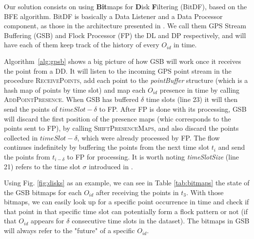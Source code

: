 Our solution consists on using \textbf{Bit}maps for \textbf{D}isk \textbf{F}iltering (BitDF), based on the BFE
algorithm. BitDF is basically a Data Listener and a Data Processor component, as those in the architecture presented in
. We call them GPS Stream Buffering (GSB) and Flock Processor (FP) the DL and DP respectively,
and will have each of them keep track of the history of every $O_{id}$ in time.

Algorithm~\ref{alg:gpsb} shows a big picture of how GSB will work once it receives the point from a DD. It will listen
to the incoming GPS point stream in the procedure \textsc{ReceivePoints}, add each point to the \textit{pointBuffer}
structure (which is a hash map of points by time slot) and map each $O_{id}$ presence in time by calling
\textsc{AddPointPresence}. When GSB has buffered $\delta$ time slots (line 23) it will then send the points of $timeSlot
- \delta$ to FP. After FP is done with its processing, GSB will discard the first position of the presence maps (whic
corresponds to the points sent to FP), by calling \textsc{ShiftPresenceMaps}, and also discard the points collected in
$timeSlot - \delta$, which were already processed by FP. The flow continues indefinitely by buffering the points from
the next time slot $t_i$ and send the points from $t_{i - \delta}$ to FP for processing. It is worth noting
\textit{timeSlotSize} (line 21) refers to the time slot $\sigma$ introduced in .

Using Fig. \ref{fig:disks} as an example, we can see in Table \ref{tab:bitmaps} the state of the GSB bitmaps for each
$O_{id}$ after receiving the points in $t_3$. With those bitmaps, we can easily look up for a specific point occurrence
in time and check if that point in that specific time slot can potentially form a flock pattern or not (if that $O_{id}$
appears for $\delta$ consecutive time slots in the dataset). The bitmaps in GSB will always refer to the "future" of a
specific $O_{id}$.

